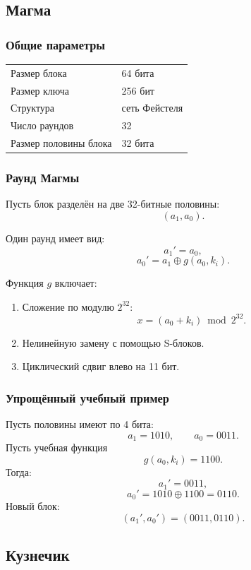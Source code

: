 \documentclass[12pt,a4paper]{article}
\begin{document}
\subsection{Магма}

\subsubsection{Общие параметры}

\begin{center}
\begin{tabular}{ll}
\toprule
Размер блока & 64 бита \\
Размер ключа & 256 бит \\
Структура & сеть Фейстеля \\
Число раундов & 32 \\
Размер половины блока & 32 бита \\
\bottomrule
\end{tabular}
\end{center}

\subsubsection{Раунд Магмы}

Пусть блок разделён на две 32-битные половины:
\[
    (a_1,a_0).
\]

Один раунд имеет вид:
\[
    a_1' = a_0,
\]
\[
    a_0' = a_1 \oplus g(a_0,k_i).
\]

Функция $g$ включает:

\begin{enumerate}
    \item Сложение по модулю $2^{32}$:
    \[
        x = (a_0+k_i)\bmod 2^{32}.
    \]
    \item Нелинейную замену с помощью S-блоков.
    \item Циклический сдвиг влево на 11 бит.
\end{enumerate}

\subsubsection{Упрощённый учебный пример}

Пусть половины имеют по 4 бита:
\[
    a_1=1010,\qquad a_0=0011.
\]
Пусть учебная функция
\[
    g(a_0,k_i)=1100.
\]
Тогда:
\[
    a_1'=0011,
\]
\[
    a_0'=1010\oplus 1100=0110.
\]
Новый блок:
\[
    (a_1',a_0')=(0011,0110).
\]

\subsection{Кузнечик}
\end{document}
